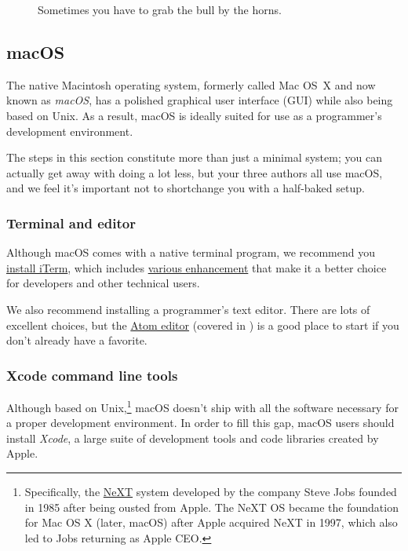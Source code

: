 \begin{figure}
\begin{center}
\end{center}
\caption{Sometimes you have to grab the bull by the horns.\label{fig:grab_bull_by_horns}}
\end{figure}

\subsection{macOS} %
\label{sec:macos}

The native Macintosh operating system, formerly called Mac OS~X and now known as \emph{macOS}, has a polished graphical user interface (GUI) while also being based on Unix. As a result, macOS is ideally suited for use as a  programmer's development environment.

The steps in this section constitute more than just a minimal system; you can actually get away with doing a lot less, but your three authors all use macOS, and we feel it's important not to shortchange you with a half-baked setup.

\subsubsection{Terminal and editor} %
\label{sec:terminal_and_editor}

Although macOS comes with a native terminal program, we recommend you \href{\href{https://www.iterm2.com/downloads.html}{iTerm}}{install iTerm}, which includes \href{https://www.iterm2.com/features.html}{various enhancement} that make it a better choice for developers and other technical users.

We also recommend installing a programmer's text editor. There are lots of excellent choices, but the \href{https://atom.io/}{Atom editor} (covered in ) is a good place to start if you don't already have a favorite.



\subsubsection{Xcode command line tools}
\label{sec:shiny_xcode}

Although based on Unix,\footnote{Specifically, the \href{https://en.wikipedia.org/wiki/NeXT}{NeXT} system developed by the company Steve Jobs founded in 1985 after being ousted from Apple. The NeXT OS became the foundation for Mac OS X (later, macOS) after Apple acquired NeXT in 1997, which also led to Jobs returning as Apple CEO.} macOS doesn't ship with all the software necessary for a proper development environment. In order to fill this gap, macOS users should install \emph{Xcode}, a large suite of development tools and code libraries created by Apple.

